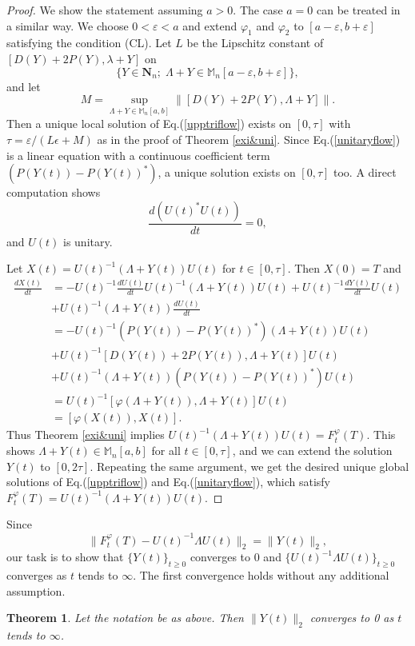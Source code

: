 \documentclass[12pt]{article}
\newtheorem{theorem}{Theorem}[section]
\theoremstyle{definition}
\numberwithin{equation}{section}
\newcommand{\M}{\mathbb{M}}
\begin{document}
\begin{proof} We show the statement assuming $a>0$. 
The case $a=0$ can be treated in a similar way. 
We choose $0<\varepsilon<a$ and extend $\varphi_1$ and $\varphi_2$ to $[a-\varepsilon,b+\varepsilon]$ 
satisfying the condition (CL). 
Let $L$ be the Lipschitz constant of $[D(Y)+2P(Y),\lambda+Y]$ on 
\[\{Y\in \mathbf{N}_n;\; \Lambda +Y\in \M_n[a-\varepsilon,b+\varepsilon] \},\]  
and let 
\[M=\sup_{\Lambda+Y\in \M_n[a,b]}\|[D(Y)+2P(Y),\Lambda+Y]\|.\]
Then a unique local solution of Eq.(\ref{upptriflow}) exists on $[0,\tau]$ with 
$\tau=\varepsilon/(L\epsilon+M)$ as in the proof of Theorem \ref{exi&uni}.   
Since Eq.(\ref{unitaryflow}) is a linear equation with a continuous coefficient term $(P(Y(t))-P(Y(t))^*)$, 
a unique solution exists on $[0,\tau]$ too. 
A direct computation shows 
\[\frac{d(U(t)^*U(t))}{dt}=0,\]
and $U(t)$ is unitary. 

Let $X(t)=U(t)^{-1}(\Lambda+Y(t))U(t)$ for $t\in [0,\tau]$. 
Then $X(0)=T$ and 
\begin{align*}
\frac{dX(t)}{dt}&=-U(t)^{-1}\frac{dU(t)}{dt}U(t)^{-1}(\Lambda+Y(t))U(t)+U(t)^{-1}\frac{dY(t)}{dt}U(t) \\
&+U(t)^{-1}(\Lambda+Y(t))\frac{dU(t)}{dt}\\
&=-U(t)^{-1}(P(Y(t))-P(Y(t))^*)(\Lambda+Y(t))U(t)\\
&+U(t)^{-1}[D(Y(t))+2P(Y(t)),\Lambda+Y(t)]U(t)\\
&+U(t)^{-1}(\Lambda+Y(t))(P(Y(t))-P(Y(t))^*)U(t)\\
&=U(t)^{-1}[\varphi(\Lambda+Y(t)),\Lambda+Y(t)]U(t)\\
&=[\varphi(X(t)),X(t)]. 
\end{align*} 
Thus Theorem \ref{exi&uni} implies $U(t)^{-1}(\Lambda+Y(t))U(t)=F^\varphi_t(T)$. 
This shows $\Lambda +Y(t)\in \M_n[a,b]$ for all $t\in [0,\tau]$, and we can extend the solution 
$Y(t)$ to $[0,2\tau]$. 
Repeating the same argument, we get the desired unique global solutions of 
Eq.(\ref{upptriflow}) and Eq.(\ref{unitaryflow}), which satisfy
$F^\varphi_t(T)=U(t)^{-1}(\Lambda+Y(t))U(t)$.   
\end{proof}

Since 
\[\|F^\varphi_t(T)-U(t)^{-1}\Lambda U(t)\|_2=\|Y(t)\|_2,\]
our task is to show that $\{Y(t)\}_{t\geq 0}$ converges to 0 and 
$\{U(t)^{-1}\Lambda U(t)\}_{t\geq 0}$ converges as $t$ tends to $\infty$. 
The first convergence holds without any additional assumption. 


\begin{theorem} Let the notation be as above. 
Then $\|Y(t)\|_2$ converges to 0 as $t$ tends to $\infty$.  
\end{theorem}
\end{document}

